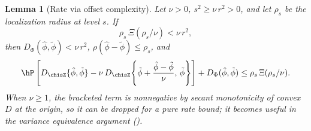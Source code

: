 \documentclass{article}
\newtheorem{lemma}[theorem]{Lemma}
\begin{document}
\begin{lemma}[Rate via offset complexity]
\label{lem:generic-rate}
Let $\nu > 0$, $s^2 \ge \nu\, r^2 > 0$, and let $\rho_s$ be the localization radius at level $s$. If
\[
\rho_s\, \Xi(\rho_s/\nu) < \nu\, r^2,
\]
then $D_\Phi(\hat\phi, \tilde\phi) < \nu\, r^2$,
$\rho(\hat\phi - \tilde\phi) \le \rho_s$,
and
\begin{equation}\label{eq:surviving-bregman}
\hP\left[D_{\chisZ}\{\hat\phi, \tilde\phi\}
  - \nu\, D_{\chisZ}\!\left\{\tilde\phi
    + \frac{\hat\phi - \tilde\phi}{\nu},\,
    \tilde\phi\right\}\right]
  + D_\Phi(\hat\phi, \tilde\phi)
  \le \rho_s\, \Xi(\rho_s/\nu).
\end{equation}
When $\nu \ge 1$, the bracketed term is nonnegative
by secant monotonicity of convex $D$ at the origin,
so it can be dropped for a pure rate bound;
it becomes useful
in the variance equivalence argument
().
\end{lemma}
\end{document}
